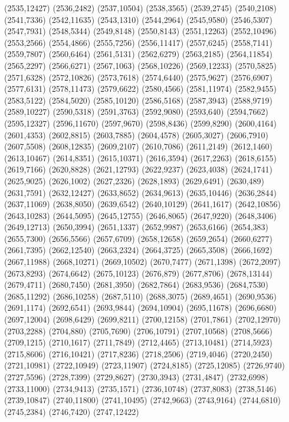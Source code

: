 (2535,12427)
(2536,2482)
(2537,10504)
(2538,3565)
(2539,2745)
(2540,2108)
(2541,7336)
(2542,11635)
(2543,1310)
(2544,2964)
(2545,9580)
(2546,5307)
(2547,7931)
(2548,5344)
(2549,8148)
(2550,8143)
(2551,12263)
(2552,10496)
(2553,2566)
(2554,4866)
(2555,7256)
(2556,11417)
(2557,6245)
(2558,7141)
(2559,7807)
(2560,6464)
(2561,5131)
(2562,6279)
(2563,2185)
(2564,11854)
(2565,2297)
(2566,6271)
(2567,1063)
(2568,10226)
(2569,12233)
(2570,5825)
(2571,6328)
(2572,10826)
(2573,7618)
(2574,6440)
(2575,9627)
(2576,6907)
(2577,6131)
(2578,11473)
(2579,6622)
(2580,4566)
(2581,11974)
(2582,9455)
(2583,5122)
(2584,5020)
(2585,10120)
(2586,5168)
(2587,3943)
(2588,9719)
(2589,10227)
(2590,5318)
(2591,3763)
(2592,9080)
(2593,640)
(2594,7662)
(2595,12327)
(2596,11670)
(2597,9670)
(2598,8436)
(2599,8290)
(2600,4164)
(2601,4353)
(2602,8815)
(2603,7885)
(2604,4578)
(2605,3027)
(2606,7910)
(2607,5508)
(2608,12835)
(2609,2107)
(2610,7086)
(2611,2149)
(2612,1460)
(2613,10467)
(2614,8351)
(2615,10371)
(2616,3594)
(2617,2263)
(2618,6155)
(2619,7166)
(2620,8828)
(2621,12793)
(2622,9237)
(2623,4038)
(2624,1741)
(2625,9025)
(2626,1002)
(2627,2326)
(2628,1893)
(2629,6491)
(2630,489)
(2631,7591)
(2632,12427)
(2633,8652)
(2634,9613)
(2635,10446)
(2636,2844)
(2637,11069)
(2638,8050)
(2639,6542)
(2640,10129)
(2641,1617)
(2642,10856)
(2643,10283)
(2644,5095)
(2645,12755)
(2646,8065)
(2647,9220)
(2648,3406)
(2649,12713)
(2650,3994)
(2651,1337)
(2652,9987)
(2653,6166)
(2654,383)
(2655,7300)
(2656,5566)
(2657,6709)
(2658,12658)
(2659,2654)
(2660,6277)
(2661,7395)
(2662,12540)
(2663,2324)
(2664,3725)
(2665,3508)
(2666,1692)
(2667,11988)
(2668,10271)
(2669,10502)
(2670,7477)
(2671,1398)
(2672,2097)
(2673,8293)
(2674,6642)
(2675,10123)
(2676,879)
(2677,8706)
(2678,13144)
(2679,4711)
(2680,7450)
(2681,3950)
(2682,7864)
(2683,9536)
(2684,7530)
(2685,11292)
(2686,10258)
(2687,5110)
(2688,3075)
(2689,4651)
(2690,9536)
(2691,1174)
(2692,6541)
(2693,9844)
(2694,10904)
(2695,11678)
(2696,6680)
(2697,12004)
(2698,6429)
(2699,8211)
(2700,12158)
(2701,7861)
(2702,12970)
(2703,2288)
(2704,880)
(2705,7690)
(2706,10791)
(2707,10568)
(2708,5666)
(2709,1215)
(2710,1617)
(2711,7849)
(2712,4465)
(2713,10481)
(2714,5923)
(2715,8606)
(2716,10421)
(2717,8236)
(2718,2506)
(2719,4046)
(2720,2450)
(2721,10981)
(2722,10949)
(2723,11907)
(2724,8185)
(2725,12085)
(2726,9740)
(2727,5596)
(2728,7399)
(2729,8627)
(2730,3943)
(2731,4847)
(2732,6998)
(2733,11000)
(2734,9413)
(2735,1571)
(2736,10748)
(2737,8083)
(2738,5146)
(2739,10847)
(2740,11800)
(2741,10495)
(2742,9663)
(2743,9164)
(2744,6810)
(2745,2384)
(2746,7420)
(2747,12422)
